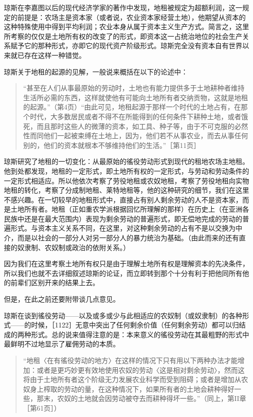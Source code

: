 琼斯在李嘉图以后的现代经济学家的著作中发现，地租被规定为超额利润，这一规定的前提是：农场主是资本家（或者说，农业资本家经营土地），他期望从资本的这种特殊使用中得到平均利润；农业本身从属于资本主义生产方式。简言之，这里所考察的仅仅是土地所有权的改变了的形式，即资本这一占统治地位的社会生产关系赋予它的那种形式，亦即它的现代资产阶级形式。琼斯完全没有资本自有世界以来就已存在这样一种错觉。

琼斯关于地租的起源的见解，一般说来概括在以下的论述中：

\begin{quote}{“甚至在人们从事最原始的劳动时，土地也有能力提供多于土地耕种者维持生活所必需的东西，这样就使他有可能向土地所有者交纳贡物，这就是地租的起源。”（第4页）“由此可见，地租起源于那样一个时代的土地占有，在那个时代，大多数居民或者不得不在所能得到的任何条件下耕种土地，或者饿死，而且那时这些人的微薄的资本，如工具、种子等，由于不可克服的必然性而同他们一起被束缚在土地上，因为，他们若不从事农业，而去从事任何别的，他们的资本就根本不够维持他们的生活。”［第11页］}\end{quote}

琼斯研究了地租的一切变化：从最原始的徭役劳动形式到现代的租地农场主地租。他到处都发现，地租的一定形式，即土地所有权的一定形式，与劳动和劳动条件的一定形式相适应。所以他依次考察了劳役地租或农奴地租，考察了劳役地租向实物地租的转化，考察了分成制地租、莱特地租等，他的这种研究的细节，我们在这里不感兴趣。在一切较早的地租形式中，直接占有别人剩余劳动的人不是资本家，而是土地所有者。地租（正如重农学派根据回忆所理解的那样）在历史上（在亚洲各民族中还是在最大范围内）表现为剩余劳动的普遍形式，即无偿地完成的劳动的普遍形式。与资本主义关系不同，在这里，对这种剩余劳动的占有不是以交换为中介，而是以社会的一部分人对另一部分人的暴力统治为基础。（由此而来的还有直接的奴隶制、农奴制或政治的依附关系。）

因为我们在这里考察土地所有权只是由于理解土地所有权是理解资本的先决条件，所以我们也就不去详细叙述琼斯的论证，而立即转到那个十分有利于把他同所有他的前辈们区别开来的结果上去。

但是，在此之前还要附带谈几点意见。

琼斯在谈到徭役劳动——以及或多或少与此相适应的农奴制（或奴隶制）的各种形式——的时候，［1122］无意中突出了任何剩余价值（任何剩余劳动）都可以归结成的两种形式。总的说来值得注意的是：本来意义的徭役劳动在其最粗野的形式中最鲜明不过地显示了雇佣劳动的本质。

\begin{quote}{“地租〈在有徭役劳动的地方〉在这样的情况下只有用以下两种办法才能增加：或者是更巧妙更有效地使用农奴的劳动〈这是相对剩余劳动〉，然而这将由于土地所有者这个阶级无力发展农业科学而受到阻碍；或者是增加从农奴身上榨取的劳动的量，在这种情况下，如果所有者的土地会耕种得好一些，那末，农奴的土地就会因劳动被夺去而耕种得坏一些。”（同上，第II章［第61页］）}\end{quote}

